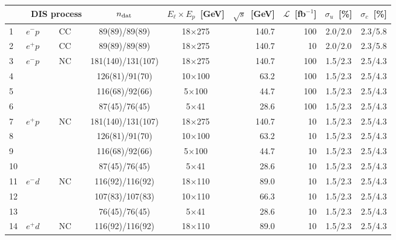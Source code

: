 \renewcommand{\arraystretch}{1.3}
  \begin{tabularx}{\linewidth}{XXXccrrcc}
    \toprule
    & \multicolumn{2}{l}{\ DIS process}
    & $n_{\rm dat}$
    & $E_\ell\times E_p$~[GeV]
    & $\sqrt{s}$~[GeV]
    & $\mathcal{L}$~[fb$^{-1}$]
    & $\sigma_u$~[\%]
    & $\sigma_c$~[\%] \\
    \midrule
      1 
    & $e^-p$
    & CC
    & 89(89)/89(89)
    & 18$\times$275
    & 140.7
    & 100
    & 2.0/2.0
    & 2.3/5.8 \\
      2
    & $e^+p$
    & CC
    & 89(89)/89(89)
    & 18$\times$275
    & 140.7
    & 10
    & 2.0/2.0
    & 2.3/5.8 \\
    \midrule
      3
    & $e^-p$
    & NC
    & 181(140)/131(107)
    & 18$\times$275
    & 140.7
    & 100
    & 1.5/2.3
    & 2.5/4.3 \\
      4 
    & 
    & 
    & 126(81)/91(70)
    & 10$\times$100
    & 63.2
    & 100
    & 1.5/2.3
    & 2.5/4.3 \\
      5
    & 
    & 
    & 116(68)/92(66)
    & 5$\times$100
    & 44.7
    & 100
    & 1.5/2.3
    & 2.5/4.3 \\
      6
    & 
    & 
    & 87(45)/76(45)
    & 5$\times$41
    & 28.6
    & 100
    & 1.5/2.3
    & 2.5/4.3 \\
      7
    & $e^+p$
    & NC
    & 181(140)/131(107)
    & 18$\times$275
    & 140.7
    & 10
    & 1.5/2.3
    & 2.5/4.3 \\
      8 
    & 
    & 
    & 126(81)/91(70)
    & 10$\times$100
    & 63.2
    & 10
    & 1.5/2.3
    & 2.5/4.3 \\
      9
    & 
    & 
    & 116(68)/92(66)
    & 5$\times$100
    & 44.7
    & 10
    & 1.5/2.3
    & 2.5/4.3 \\
      10  
    & 
    & 
    & 87(45)/76(45)
    & 5$\times$41
    & 28.6
    & 10
    & 1.5/2.3
    & 2.5/4.3 \\
    \midrule
      11
    & $e^-d$
    & NC
    & 116(92)/116(92)
    & 18$\times$110
    & 89.0
    & 10
    & 1.5/2.3
    & 2.5/4.3 \\
      12 
    &
    &
    & 107(83)/107(83)
    & 10$\times$110
    & 66.3
    & 10
    & 1.5/2.3
    & 2.5/4.3 \\
      13  
    &
    &
    & 76(45)/76(45)
    & 5$\times$41
    & 28.6
    & 10
    & 1.5/2.3
    & 2.5/4.3 \\
      14
    & $e^+d$
    & NC
    & 116(92)/116(92)
    & 18$\times$110
    & 89.0
    & 10
    & 1.5/2.3
    & 2.5/4.3 \\

\end{tabularx}
